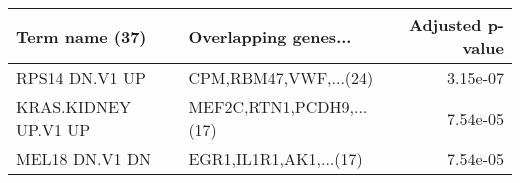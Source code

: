 \begin{tabular}{llr}
\toprule
      Term name (37) &     Overlapping genes... &  Adjusted p-value \\
\midrule
      RPS14 DN.V1 UP &    CPM,RBM47,VWF,...(24) &          3.15e-07 \\
KRAS.KIDNEY UP.V1 UP & MEF2C,RTN1,PCDH9,...(17) &          7.54e-05 \\
      MEL18 DN.V1 DN &   EGR1,IL1R1,AK1,...(17) &          7.54e-05 \\
\bottomrule
\end{tabular}
